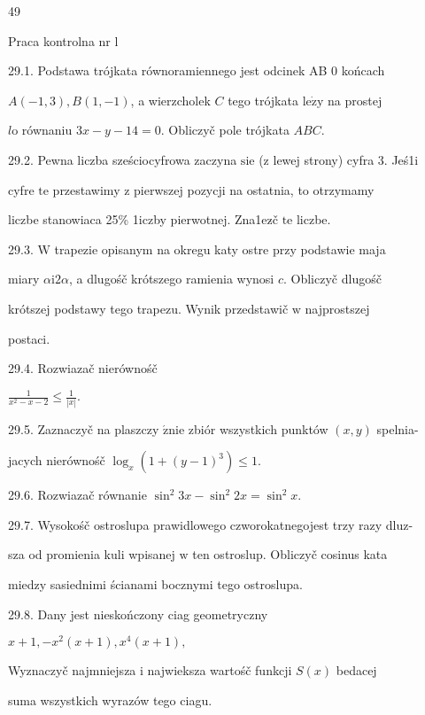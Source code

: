 \documentclass[a4paper,12pt]{article}
\begin{document}
49

Praca kontrolna nr l

29.1. Podstawa trójkata równoramiennego jest odcinek AB $0$ końcach

$A(-1,3), B(1,-1)$, a wierzcholek $C$ tego trójkata $\mathrm{l}\mathrm{e}\dot{\mathrm{z}}\mathrm{y}$ na prostej

$l\mathrm{o}$ równaniu $3x-y-14=0$. Obliczyč pole trójkata $ABC.$

29.2. Pewna liczba sześciocyfrowa zaczyna $\mathrm{s}\mathrm{i}\mathrm{e}$ ($\mathrm{z}$ lewej strony) cyfra 3. Jeś1i

cyfre $\mathrm{t}\mathrm{e}$ przestawimy $\mathrm{z}$ pierwszej pozycji na ostatnia, to otrzymamy

liczbe stanowiaca 25\% 1iczby pierwotnej. Zna1ez$\acute{}$č $\mathrm{t}\mathrm{e}$ liczbe.

29.3. $\mathrm{W}$ trapezie opisanym na okregu katy ostre przy podstawie maja

miary $\alpha \mathrm{i}2\alpha$, a dlugośč krótszego ramienia wynosi $c$. Obliczyč dlugośč

krótszej podstawy tego trapezu. Wynik przedstawič $\mathrm{w}$ najprostszej

postaci.

29.4. Rozwiazač nierównośč

$\displaystyle \frac{1}{x^{2}-x-2}\leq\frac{1}{|x|}.$

29.5. Zaznaczyč na plaszczy $\acute{\mathrm{z}}\mathrm{n}\mathrm{i}\mathrm{e}$ zbiór wszystkich punktów $(x,y)$ spelnia-

jacych nierównośč $\log_{x}(1+(y-1)^{3})\leq 1.$

29.6. Rozwiazač równanie $\sin^{2}3x-\sin^{2}2x=\sin^{2}x.$

29.7. Wysokośč ostroslupa prawidlowego czworokatnegojest trzy razy dluz-

sza od promienia kuli wpisanej $\mathrm{w}$ ten ostroslup. Obliczyč cosinus kata

miedzy sasiednimi ścianami bocznymi tego ostroslupa.

29.8. Dany jest nieskończony ciag geometryczny

$x+1,-x^{2}(x+1),x^{4}(x+1),$

Wyznaczyč najmniejsza $\mathrm{i}$ najwieksza wartośč funkcji $S(x)$ bedacej

suma wszystkich wyrazów tego ciagu.
\end{document}
